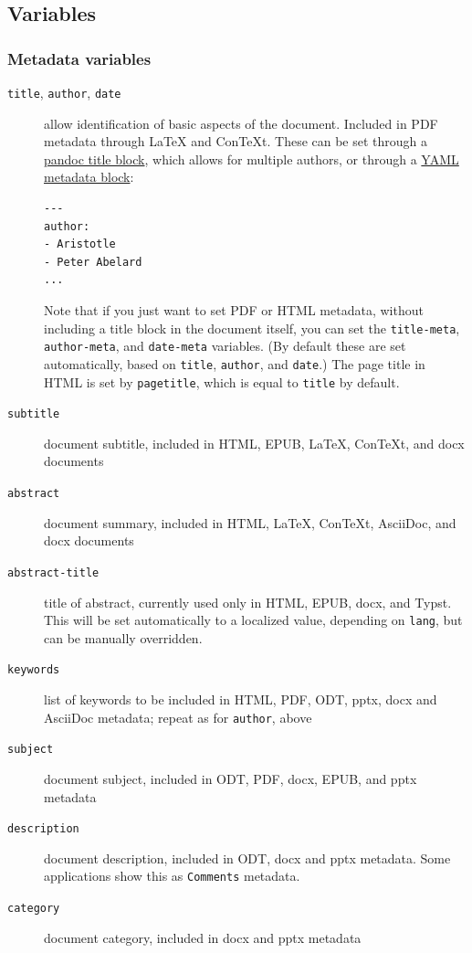 \documentclass[
]{article}
\begin{document}
\hypertarget{variables}{%
\subsection{Variables}\label{variables}}

\hypertarget{metadata-variables}{%
\subsubsection{Metadata variables}\label{metadata-variables}}

\begin{description}
\item[\texttt{title}, \texttt{author}, \texttt{date}]
allow identification of basic aspects of the document. Included in PDF
metadata through LaTeX and ConTeXt. These can be set through a
\protect\hyperlink{extension-pandoc_title_block}{pandoc title block},
which allows for multiple authors, or through a
\protect\hyperlink{extension-yaml_metadata_block}{YAML metadata block}:

\begin{verbatim}
---
author:
- Aristotle
- Peter Abelard
...
\end{verbatim}

Note that if you just want to set PDF or HTML metadata, without
including a title block in the document itself, you can set the
\texttt{title-meta}, \texttt{author-meta}, and \texttt{date-meta}
variables. (By default these are set automatically, based on
\texttt{title}, \texttt{author}, and \texttt{date}.) The page title in
HTML is set by \texttt{pagetitle}, which is equal to \texttt{title} by
default.
\item[\texttt{subtitle}]
document subtitle, included in HTML, EPUB, LaTeX, ConTeXt, and docx
documents
\item[\texttt{abstract}]
document summary, included in HTML, LaTeX, ConTeXt, AsciiDoc, and docx
documents
\item[\texttt{abstract-title}]
title of abstract, currently used only in HTML, EPUB, docx, and Typst.
This will be set automatically to a localized value, depending on
\texttt{lang}, but can be manually overridden.
\item[\texttt{keywords}]
list of keywords to be included in HTML, PDF, ODT, pptx, docx and
AsciiDoc metadata; repeat as for \texttt{author}, above
\item[\texttt{subject}]
document subject, included in ODT, PDF, docx, EPUB, and pptx metadata
\item[\texttt{description}]
document description, included in ODT, docx and pptx metadata. Some
applications show this as \texttt{Comments} metadata.
\item[\texttt{category}]
document category, included in docx and pptx metadata
\end{description}
\end{document}
